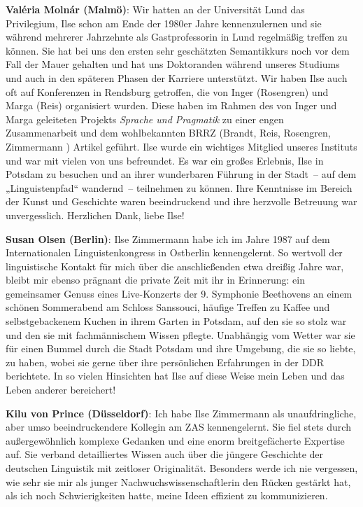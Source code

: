 \documentclass[output=paper,colorlinks,citecolor=brown]{langscibook}
\begin{document}
\noindent \textbf{Valéria Molnár (Malmö)}: Wir hatten an der Universität Lund das Privilegium, Ilse schon am Ende der 1980er Jahre kennenzulernen und sie während mehrerer Jahrzehnte als Gastprofessorin in Lund regelmäßig treffen zu können. Sie hat bei uns den ersten sehr geschätzten Semantikkurs noch vor dem Fall der Mauer gehalten und hat uns Doktoranden während unseres Studiums und auch in den späteren Phasen der Karriere unterstützt. Wir haben Ilse auch oft auf Konferenzen in Rendsburg getroffen, die von Inger (Rosengren) und Marga (Reis) organisiert wurden. Diese haben im Rahmen des von Inger und Marga geleiteten Projekts \textit{Sprache und Pragmatik} zu einer engen Zusammenarbeit und dem wohl\-be\-kannt\-en BRRZ (Brandt, Reis, Rosengren, Zimmermann \citeyear{Zimmermann1992a}) Artikel geführt. Ilse wurde ein wichtiges Mitglied unseres Instituts und war mit vielen von uns befreundet. Es war ein großes Erlebnis, Ilse in Potsdam zu besuchen und an ihrer wunderbaren Führung in der Stadt~-- auf dem „Linguistenpfad“ wandernd~-- teilnehmen zu können. Ihre Kenntnisse im Bereich der Kunst und Geschichte waren beeindruckend und ihre herzvolle Betreuung war unvergesslich. Herz\-li\-chen Dank, liebe Ilse! \medskip

\noindent \textbf{Susan Olsen (Berlin)}: Ilse Zimmermann habe ich im Jahre 1987 auf dem Internationalen Linguistenkongress in Ostberlin kennengelernt. So wertvoll der linguistische Kontakt für mich über die anschließenden etwa dreißig Jahre war, bleibt mir ebenso prägnant die private Zeit mit ihr in Erinnerung: ein gemeinsamer Genuss eines Live-Konzerts der 9. Symphonie Beethovens an einem schönen Sommerabend am Schloss Sanssouci, häufige Treffen zu Kaffee und selbstge\-ba\-cke\-nem Kuchen in ihrem Garten in Potsdam, auf den sie so stolz war und den sie mit fachmännischem Wissen pflegte. Unabhängig vom Wetter war sie für einen Bummel durch die Stadt Potsdam und ihre Umgebung, die sie so liebte, zu haben, wobei sie gerne über ihre persönlichen Erfahrungen in der DDR berichtete. In so vielen Hinsichten hat Ilse auf diese Weise mein Leben und das Leben anderer bereichert! \medskip

\noindent \textbf{Kilu von Prince (Düsseldorf)}: Ich habe Ilse Zimmermann als unaufdringliche, aber umso beeindruckendere Kollegin am ZAS kennengelernt. Sie fiel stets durch außergewöhnlich komplexe Gedanken und eine enorm breitgefächerte Expertise auf. Sie verband detailliertes Wissen auch über die jüngere Geschichte der deutschen Linguistik mit zeitloser Originalität. Besonders werde ich nie ver\-ges\-sen, wie sehr sie mir als junger Nachwuchswissenschaftlerin den Rücken ge\-stärkt hat, als ich noch Schwierigkeiten hatte, meine Ideen effizient zu kommunizieren. \medskip
\end{document}
